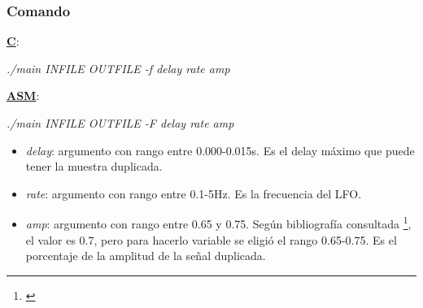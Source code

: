 \subsubsection{Comando}
\label{subsec:desarrollo-flanger-call}

\underline{\textbf{C}}:
\begin{center}
 \textit{./main INFILE OUTFILE -f delay rate amp}
\end{center}

\underline{\textbf{ASM}}:
\begin{center}
 \textit{./main INFILE OUTFILE -F delay rate amp}
\end{center}

\begin{itemize}
 \item \textit{delay}: argumento con rango entre 0.000-0.015s. Es el delay máximo que puede tener la muestra duplicada.
 \item \textit{rate}: argumento con rango entre 0.1-5Hz. Es la frecuencia del LFO.
 \item \textit{amp}: argumento con rango entre 0.65 y 0.75. Según bibliografía consultada \footnote{\cite[p.~77]{zolzer11}}, el valor es 0.7, pero para hacerlo variable se eligió el rango 0.65-0.75. Es el porcentaje de la amplitud de la señal duplicada.
\end{itemize}